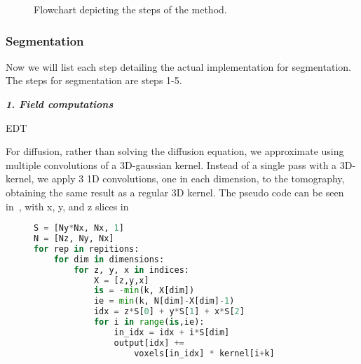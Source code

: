 \begin{figure}
    \centering
    \caption{Flowchart depicting the steps of the method.
    }
    \label{fig:flowchart}
\end{figure}

\subsubsection{Segmentation}
Now we will list each step detailing the actual implementation for segmentation. The steps for segmentation are steps 1-5.

\vspace{\baselineskip}
\noindent\textit{\textbf{1. Field computations}}

EDT

For diffusion, rather than solving the diffusion equation, we approximate using multiple convolutions of a 3D-gaussian kernel.
Instead of a single pass with a 3D-kernel, we apply 3 1D convolutions, one in each dimension, to the tomography, obtaining the same result as a regular 3D kernel.
The pseudo code can be seen in~, with x, y, and z slices in~

\begin{figure}
    \begin{lstlisting}[language=Python,caption=Python-like pseudo code for the diffusion approximation.,label=lis:diffusion]
S = [Ny*Nx, Nx, 1]
N = [Nz, Ny, Nx]
for rep in repitions:
    for dim in dimensions:
        for z, y, x in indices:
            X = [z,y,x]
            is = -min(k, X[dim])
            ie = min(k, N[dim]-X[dim]-1)
            idx = z*S[0] + y*S[1] + x*S[2]
            for i in range(is,ie):
                in_idx = idx + i*S[dim]
                output[idx] +=
                    voxels[in_idx] * kernel[i+k]
    \end{lstlisting}
\end{figure}


